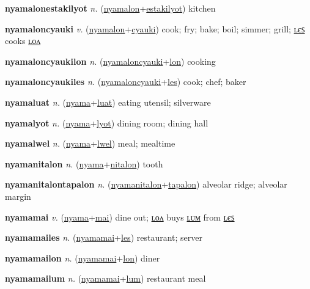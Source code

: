 \textbf{\hypertarget{nyamalonestakilyot}{nyamalonestakilyot}} \textit{n.} (\hyperlink{nyamalon}{nyamalon}+\allowbreak \hyperlink{estakilyot}{estakilyot})
kitchen

\textbf{\hypertarget{nyamaloncyauki}{nyamaloncyauki}} \textit{v.} (\hyperlink{nyamalon}{nyamalon}+\allowbreak \hyperlink{cyauki}{cyauki})
cook; fry; bake; boil; simmer; grill; \hyperlink{nyamaloncyaukiles}{ʟєꜱ} cooks \hyperlink{nyamaloncyaukilon}{ʟᴏᴧ}

\textbf{\hypertarget{nyamaloncyaukilon}{nyamaloncyaukilon}} \textit{n.} (\hyperlink{nyamaloncyauki}{nyamaloncyauki}+\allowbreak \hyperlink{lon}{lon})
cooking

\textbf{\hypertarget{nyamaloncyaukiles}{nyamaloncyaukiles}} \textit{n.} (\hyperlink{nyamaloncyauki}{nyamaloncyauki}+\allowbreak \hyperlink{les}{les})
cook; chef; baker

\textbf{\hypertarget{nyamaluat}{nyamaluat}} \textit{n.} (\hyperlink{nyama}{nyama}+\allowbreak \hyperlink{luat}{luat})
eating utensil; silverware

\textbf{\hypertarget{nyamalyot}{nyamalyot}} \textit{n.} (\hyperlink{nyama}{nyama}+\allowbreak \hyperlink{lyot}{lyot})
dining room; dining hall

\textbf{\hypertarget{nyamalwel}{nyamalwel}} \textit{n.} (\hyperlink{nyama}{nyama}+\allowbreak \hyperlink{lwel}{lwel})
meal; mealtime

\textbf{\hypertarget{nyamanitalon}{nyamanitalon}} \textit{n.} (\hyperlink{nyama}{nyama}+\allowbreak \hyperlink{nitalon}{nitalon})
tooth

\textbf{\hypertarget{nyamanitalontapalon}{nyamanitalontapalon}} \textit{n.} (\hyperlink{nyamanitalon}{nyamanitalon}+\allowbreak \hyperlink{tapalon}{tapalon})
alveolar ridge; alveolar margin

\textbf{\hypertarget{nyamamai}{nyamamai}} \textit{v.} (\hyperlink{nyama}{nyama}+\allowbreak \hyperlink{mai}{mai})
dine out; \hyperlink{nyamamailon}{ʟᴏᴧ} buys \hyperlink{nyamamailum}{ʟᴜᴍ} from \hyperlink{nyamamailes}{ʟєꜱ}

\textbf{\hypertarget{nyamamailes}{nyamamailes}} \textit{n.} (\hyperlink{nyamamai}{nyamamai}+\allowbreak \hyperlink{les}{les})
restaurant; server

\textbf{\hypertarget{nyamamailon}{nyamamailon}} \textit{n.} (\hyperlink{nyamamai}{nyamamai}+\allowbreak \hyperlink{lon}{lon})
diner

\textbf{\hypertarget{nyamamailum}{nyamamailum}} \textit{n.} (\hyperlink{nyamamai}{nyamamai}+\allowbreak \hyperlink{lum}{lum})
restaurant meal

